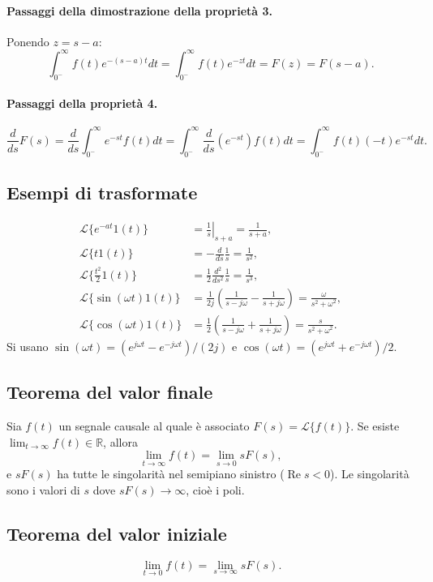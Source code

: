 \paragraph{Passaggi della dimostrazione della proprietà 3.}
Ponendo $z=s-a$:
\[\int_{0^-}^{\infty}f(t)e^{-(s-a)t}dt
=\int_{0^-}^{\infty}f(t)e^{-zt}dt=F(z)=F(s-a).\]
\paragraph{Passaggi della proprietà 4.}
\[\frac d{ds}F(s)=\frac d{ds}\int_{0^-}^{\infty}e^{-st}f(t)dt
=\int_{0^-}^{\infty}\frac d{ds}(e^{-st})f(t)dt
=\int_{0^-}^{\infty}f(t)(-t)e^{-st}dt.\]

\subsection*{Esempi di trasformate}
\begin{align*}
\mathcal L\{e^{-at}1(t)\}&=\left.\frac1s\right|_{s+a}=\frac1{s+a},\\
\mathcal L\{t1(t)\}&=-\frac d{ds}\frac1s=\frac1{s^2},\\
\mathcal L\{\tfrac{t^2}2 1(t)\}&=\frac12\frac{d^2}{ds^2}\frac1s=\frac1{s^3},\\
\mathcal L\{\sin(\omega t)1(t)\}&=\frac1{2j}\left(\frac1{s-j\omega}-\frac1{s+j\omega}\right)=\frac\omega{s^2+\omega^2},\\
\mathcal L\{\cos(\omega t)1(t)\}&=\frac12\left(\frac1{s-j\omega}+\frac1{s+j\omega}\right)=\frac s{s^2+\omega^2}.
\end{align*}
Si usano $\sin(\omega t)=(e^{j\omega t}-e^{-j\omega t})/(2j)$ e $\cos(\omega t)=(e^{j\omega t}+e^{-j\omega t})/2$.
\subsection*{Teorema del valor finale}
Sia $f(t)$ un segnale causale al quale è associato $F(s)=\mathcal L\{f(t)\}$. Se esiste $\lim_{t\to\infty}f(t)\in\mathbb R$, allora
\[\lim_{t\to\infty}f(t)=\lim_{s\to0}sF(s),\]
e $sF(s)$ ha tutte le singolarità nel semipiano sinistro ($\operatorname{Re}s<0$). Le singolarità sono i valori di $s$ dove $sF(s)\to\infty$, cioè i poli.
\subsection*{Teorema del valor iniziale}
\[\lim_{t\to0}f(t)=\lim_{s\to\infty}sF(s).\]
